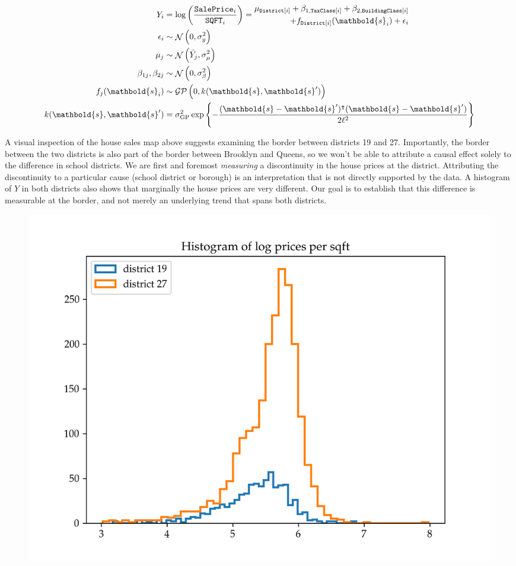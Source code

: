 \documentclass[letter]{article}
\makeatletter
\def\maxwidth{\ifdim\Gin@nat@width>\linewidth\linewidth
\else\Gin@nat@width\fi}
\let\Oldincludegraphics\includegraphics
\renewcommand{\includegraphics}[1]{\Oldincludegraphics[width=1.0\maxwidth]{#1}}
\DeclareMathOperator{\normal}{\mathcal{N}}
\newcommand{\saleprice}{\mathtt{SalePrice}}
\newcommand{\sqft}{\mathtt{SQFT}}
\newcommand{\tax}{\mathtt{TaxClass}}
\newcommand{\building}{\mathtt{BuildingClass}}
\newcommand{\district}{\mathtt{District}}
\newcommand{\gp}{\mathcal{GP}}
\newcommand{\trans}{^{\intercal}}
\newcommand{\sigmaf}{\sigma_{\mathrm{GP}}}
\newcommand{\svec}{\mathbold{s}}
\makeatother
\begin{document}
\begin{equation}
\begin{split}
    Y_i &= \log\del{ \frac{\saleprice_i}{\sqft_i}} =
        \begin{split}
             \mu_{\district\sbr{i}} + \beta_{1,\tax\sbr{i}} + \beta_{2,\building\sbr{i}} \\
                  + f_{\district\sbr{i}}(\svec_i) + \epsilon_i \\
         \end{split}
    \\
    \epsilon_i &\sim \normal\del{0, \sigma_y^2} \\
    \mu_{j} &\sim \normal\del{\bar{Y}_j, \sigma_\mu^2} \\
    \beta_{1j},\beta_{2j} &\sim \normal\del{0, \sigma_\beta^2} \\
    f_j(\svec_i) &\sim \gp\del{0, k(\svec, \svec')} \\
    k(\svec, \svec') &= \sigmaf^2 \exp\cbr{ - \frac{(\svec-\svec')\trans(\svec-\svec')}{2\ell^2}}
\end{split}
\end{equation}

A visual inspection of the house sales map above suggests examining the border between districts 19 and 27. Importantly, the border between the two districts is also part of the border between Brooklyn and Queens, so we won't be able to attribute a causal effect solely to the difference in school districts. We are first and foremost \emph{measuring} a discontinuity in the house prices at the district. Attributing the discontinuity to a particular cause (school district or borough) is an interpretation that is not directly supported by the data.
A histogram of \(Y\) in both districts also shows that marginally the house prices are very different.
Our goal is to establish that this difference is measurable at the border, and not merely an underlying trend that spans both districts.

\begin{figure}
\centering
\includegraphics{../NYC/NYC_plots/sales_histogram_19-27.png}
\caption{}
\end{figure}
    
\end{document}
